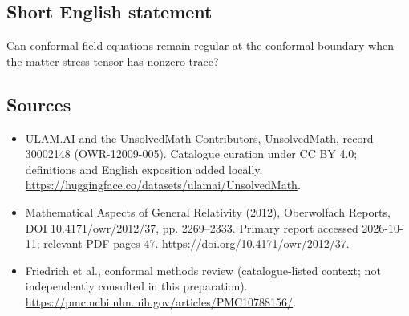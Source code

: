 \documentclass[11pt]{article}
\begin{document}
\subsection{Short English statement}
Can conformal field equations remain regular at the conformal boundary when the matter stress tensor has nonzero trace?
\subsection{Sources}
\begin{itemize}
\item[\hypertarget{source:30002148:1}{S1}] ULAM.AI and the UnsolvedMath Contributors, UnsolvedMath, record 30002148 (OWR-12009-005). Catalogue curation under CC BY 4.0; definitions and English exposition added locally.
\url{https://huggingface.co/datasets/ulamai/UnsolvedMath}.
\item[\hypertarget{source:30002148:2}{S2}] Mathematical Aspects of General Relativity (2012), Oberwolfach Reports, DOI 10.4171/owr/2012/37, pp. 2269--2333. Primary report accessed 2026-10-11; relevant PDF pages 47.
\url{https://doi.org/10.4171/owr/2012/37}.
\item[\hypertarget{source:30002148:3}{S3}] Friedrich et al., conformal methods review (catalogue-listed context; not independently consulted in this preparation).
\url{https://pmc.ncbi.nlm.nih.gov/articles/PMC10788156/}.
\end{itemize}
\label{end:30002148}
\end{document}
